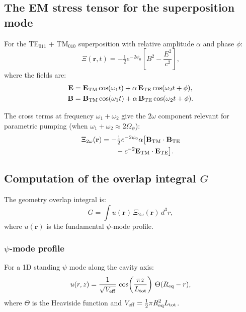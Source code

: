 \documentclass[12pt,aps,prd,twocolumn,superscriptaddress,nofootinbib]{revtex4-2}
\newcommand{\Opsi}{\Omega_\psi}
\newcommand{\half}{\tfrac{1}{2}}
\newcommand{\br}{\mathbf{r}}
\begin{document}
\subsection{The EM stress tensor for the superposition mode}
\label{sec:Xi_superposition}

For the TE$_{011}$ + TM$_{010}$ superposition with relative
amplitude $\alpha$ and phase $\phi$:
\begin{equation}
\Xi(\br,t) = -\half e^{-2\psi_0}\left[B^2 - \frac{E^2}{c^2}\right],
\label{eq:Xi_super}
\end{equation}
where the fields are:
\begin{align}
\mathbf{E} &= \mathbf{E}_{\rm TM}\cos(\omega_1 t)
+ \alpha\,\mathbf{E}_{\rm TE}\cos(\omega_2 t + \phi),\\
\mathbf{B} &= \mathbf{B}_{\rm TM}\cos(\omega_1 t)
+ \alpha\,\mathbf{B}_{\rm TE}\cos(\omega_2 t + \phi).
\end{align}

The cross terms at frequency $\omega_1 + \omega_2$ give the
$2\omega$ component relevant for parametric pumping (when
$\omega_1 + \omega_2 \approx 2\Opsi$):
\begin{align}
\Xi_{2\omega}(\br) &= -\half e^{-2\psi_0}\alpha\bigl[
\mathbf{B}_{\rm TM}\cdot\mathbf{B}_{\rm TE}
\nonumber\\
&\qquad - c^{-2}\mathbf{E}_{\rm TM}\cdot\mathbf{E}_{\rm TE}
\bigr].
\label{eq:Xi_2omega}
\end{align}

\subsection{Computation of the overlap integral $G$}
\label{sec:overlap_numerical}

The geometry overlap integral is:
\begin{equation}
G = \int u(\br)\,\Xi_{2\omega}(\br)\,d^3r,
\label{eq:G_integral}
\end{equation}
where $u(\br)$ is the fundamental $\psi$-mode profile.

\subsubsection{$\psi$-mode profile}

For a 1D standing $\psi$ mode along the cavity axis:
\begin{equation}
u(r,z) = \frac{1}{\sqrt{V_{\rm eff}}}\,\cos\!\left(\frac{\pi z}{L_{\rm tot}}
\right)\,\Theta(R_{\rm eq}-r),
\label{eq:psi_mode}
\end{equation}
where $\Theta$ is the Heaviside function and
$V_{\rm eff} = \half\pi R_{\rm eq}^2 L_{\rm tot}$.
\end{document}

